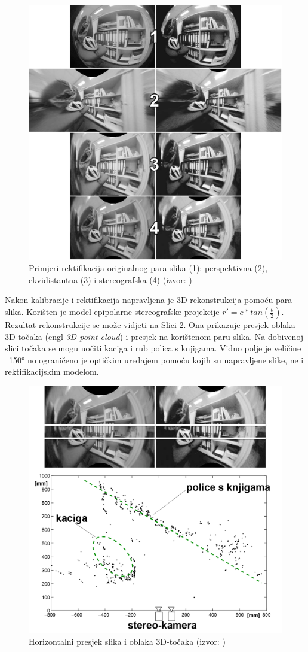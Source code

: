 \documentclass[../seminar.tex]{subfiles}
\begin{document}
\begin{figure}[ht!]
  \centering
    \includegraphics[width=.9\textwidth]{calib_rect_examples.png}
   \caption{Primjeri rektifikacija originalnog para slika (1): perspektivna (2), ekvidistantna (3) i stereografska (4) (izvor: \cite{Abraham})}
  \label{fig:calib_rect_examples}
\end{figure}

Nakon kalibracije i rektifikacija napravljena je 3D-rekonstrukcija pomoću para slika. Korišten je model epipolarne stereografske projekcije $r' = c * tan(\frac{\theta}{2})$. Rezultat rekonstrukcije se može vidjeti na Slici \ref{fig:calib_rect_examples}. Ona prikazuje presjek oblaka 3D-točaka (engl \textit{3D-point-cloud}) i presjek na korištenom paru slika. Na dobivenoj slici točaka se mogu uočiti kaciga i rub polica s knjigama. Vidno polje je veličine ~150° no ograničeno je optičkim uređajem pomoću kojih su napravljene slike, ne i rektifikacijskim modelom.

\begin{figure}[ht!]
  \centering
    \includegraphics[width=.9\textwidth]{example_helmet_bookcase.png}
   \caption{Horizontalni presjek slika i oblaka 3D-točaka (izvor: \cite{Abraham})}
  \label{fig:calib_rect_examples}
\end{figure}
\end{document}
